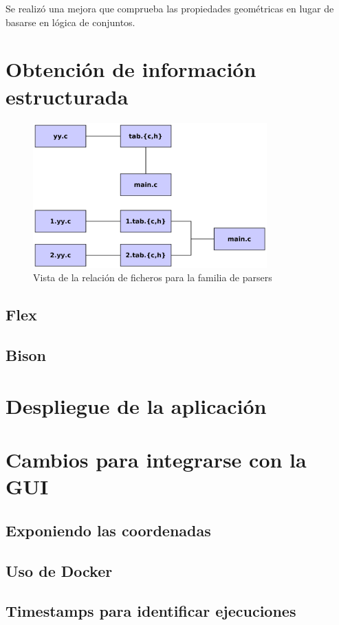 Se realizó una mejora que comprueba las propiedades geométricas en lugar de basarse en lógica de conjuntos.

\section{Obtención de información estructurada}

\begin{figure}[hp!]
  \centering
  \includegraphics[width=9cm]{imaxes/estructura-parser.png}
  \caption{Vista de la relación de ficheros para la familia de parsers}
\end{figure}

\subsection{Flex}
\subsection{Bison}
\section{Despliegue de la aplicación}
\section{Cambios para integrarse con la GUI}
\subsection{Exponiendo las coordenadas}
\subsection{Uso de Docker}
\subsection{Timestamps para identificar ejecuciones}


